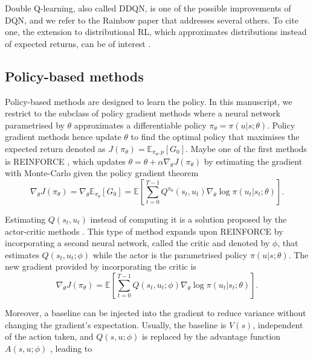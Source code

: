 Double Q-learning, also called DDQN, is one of the possible improvements of DQN, and we refer to the Rainbow paper \citep{hessel2018rainbow} that addresses several others.
To cite one, the extension to distributional RL, which approximates distributions instead of expected returns, can be of interest \citep{bellemare2017distributional, THEATE2023199}. 

\subsection{Policy-based methods} \label{sec:ch2_policy_based_methods}
Policy-based methods are designed to learn the policy.
In this manuscript, we restrict to the subclass of policy gradient methods where a neural network parametrised by $\theta$ approximates a differentiable policy $\pi_\theta=\pi(u|s;\theta)$.
Policy gradient methods hence update $\theta$ to find the optimal policy that maximises the expected return denoted as  $J(\pi_\theta) = \mathbb{E}_{\pi_\theta, p}[G_0]$.
Maybe one of the first methods is REINFORCE \citep{williams1992simple}, which updates $\theta = \theta + \alpha \nabla_\theta J(\pi_\theta)$ by estimating the gradient with Monte-Carlo given the policy gradient theorem \citep{sutton1999policy} 
\begin{equation}
\label{eq:ch2_reinforce_grad}
    \nabla_\theta J(\pi_\theta) = \nabla_\theta \mathbb{E}_{\pi_\theta}[G_0] = \mathbb{E}\left[\sum_{t=0}^{T-1} Q^{\pi_\theta}(s_t, u_t) \nabla_\theta \log \pi(u_t|s_t;\theta)\right].
\end{equation}

Estimating $Q(s_t, u_t)$ instead of computing it is a solution proposed by the actor-critic methods \citep{sutton1999policy,konda1999actor}.
This type of method expands upon REINFORCE by incorporating a second neural network, called the critic and denoted by $\phi$, that estimates $Q(s_t, u_t;\phi)$ while the actor is the parametrised policy $\pi(u|s;\theta)$.
The new gradient provided by incorporating the critic is
\begin{equation}
\label{eq:ch2_Q_actor_crit}
    \nabla_\theta J(\pi_\theta) = \mathbb{E}\left[\sum_{t=0}^{T-1} Q(s_t, u_t;\phi) \nabla_\theta \log \pi(u_t|s_t;\theta)\right].
\end{equation}

Moreover, a baseline can be injected into the gradient to reduce variance without changing the gradient's expectation.
Usually, the baseline is  $V(s)$, independent of the action taken, and $Q(s, u;\phi)$ is replaced by the advantage function $A(s,u; \phi)$ \citep{10.5555/2074022.2074088}, leading to


